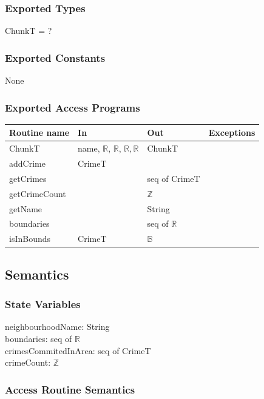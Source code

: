 \documentclass[12pt]{article}
\begin{document}
\subsubsection* {Exported Types}

ChunkT = ?

\subsubsection* {Exported Constants}

None

\subsubsection* {Exported Access Programs}

\begin{tabular}{| l | l | l | p{6cm} |}
\hline
\textbf{Routine name} & \textbf{In} & \textbf{Out} & \textbf{Exceptions}\\
\hline
ChunkT & name, $\mathbb{R}$, $\mathbb{R}$, $\mathbb{R}, \mathbb{R}$ & ChunkT & ~\\
\hline
addCrime & CrimeT & ~ & ~\\
\hline
getCrimes & ~ & seq of CrimeT & ~\\
\hline
getCrimeCount & ~ & $\mathbb{Z}$ & ~\\
\hline
getName & ~ & String & ~\\
\hline
boundaries & ~ & seq of $\mathbb{R}$ & ~\\
\hline
isInBounds & CrimeT & $\mathbb{B}$ & ~\\
\hline
\end{tabular}

\subsection* {Semantics}

\subsubsection* {State Variables}

neighbourhoodName: String\\
boundaries: seq of $\mathbb{R}$\\
crimesCommitedInArea: seq of CrimeT\\
crimeCount: $\mathbb{Z}$


\subsubsection* {Access Routine Semantics}
\end{document}
